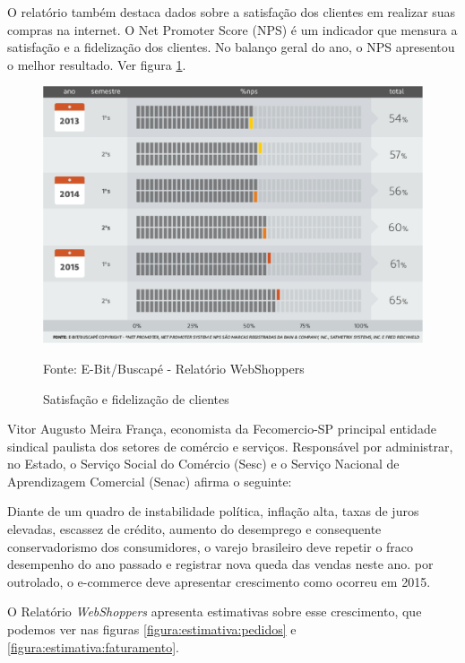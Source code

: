 \documentclass[a4paper,12pt]{monografia}
\begin{document}
O relatório também destaca dados sobre a satisfação dos clientes em realizar suas compras na internet. O Net Promoter Score (NPS) é um indicador que mensura a satisfação e a fidelização dos clientes. No balanço geral do ano, o NPS apresentou o melhor resultado. Ver figura \ref{figura:nps}.

\begin{figure}[H]
\centering
\includegraphics[width=12cm]{img/webshoppers/nps.eps}
\caption{Satisfação e fidelização de clientes}
\small{Fonte: E-Bit/Buscapé - Relatório WebShoppers}
\label{figura:nps}
\end{figure}

Vitor Augusto Meira França, economista da Fecomercio-SP principal entidade sindical paulista dos setores de comércio e serviços. Responsável por administrar, no Estado, o Serviço Social do Comércio (Sesc) e o Serviço Nacional de Aprendizagem Comercial (Senac) afirma o seguinte:

\begin{citacao}
Diante de um quadro de instabilidade política, inflação alta, taxas de juros elevadas, escassez de crédito, aumento do desemprego e consequente conservadorismo dos consumidores, o varejo brasileiro deve repetir o fraco desempenho do ano passado e registrar nova queda das vendas neste ano. por outrolado, o e-commerce deve apresentar crescimento como ocorreu em 2015. \cite{webshoppers}
\end{citacao}

O Relatório \textit{WebShoppers} apresenta estimativas sobre esse crescimento, que podemos ver nas figuras \ref{figura:estimativa:pedidos} e \ref{figura:estimativa:faturamento}.
\end{document}
